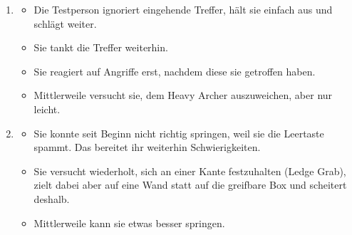 \documentclass[../Main.tex]{subfiles}
\begin{document}
\begin{enumerate}[label=\textbf{B\arabic*}, leftmargin=1.5cm, itemsep=0.8em]
    \item
        \begin{itemize}[nosep]
            \item Die Testperson ignoriert eingehende Treffer, hält sie einfach aus und schlägt weiter.
            \item Sie tankt die Treffer weiterhin.
            \item Sie reagiert auf Angriffe erst, nachdem diese sie getroffen haben.
            \item Mittlerweile versucht sie, dem Heavy Archer auszuweichen, aber nur leicht.
        \end{itemize}

    \item
        \begin{itemize}[nosep]
            \item Sie konnte seit Beginn nicht richtig springen, weil sie die Leertaste spammt. Das bereitet ihr weiterhin Schwierigkeiten.
            \item Sie versucht wiederholt, sich an einer Kante festzuhalten (Ledge Grab), zielt dabei aber auf eine Wand statt auf die greifbare Box und scheitert deshalb.
            \item Mittlerweile kann sie etwas besser springen.
        \end{itemize}
\end{enumerate}
\end{document}
